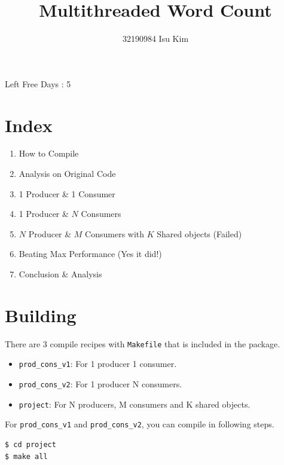 \documentclass{homework}
\begin{document}
\title{Multithreaded Word Count}
\author{32190984 Isu Kim}
\maketitle

\newenvironment{code}{\captionsetup{type=listing}}{}

\maketitle
\begin{center}
Left Free Days : 5
\end{center}
\pagebreak

\section{Index}
\begin{enumerate}
   \item How to Compile
   \item Analysis on Original Code
   \item 1 Producer \& 1 Consumer
   \item 1 Producer \& $N$ Consumers
   \item $N$ Producer \& $M$ Consumers with $K$ Shared objects (Failed)
   \item Beating Max Performance (Yes it did!)
   \item Conclusion \& Analysis
\end{enumerate}
\pagebreak

\setcounter{section}{0}
\section{Building} 
There are 3 compile recipes with \texttt{Makefile} that is included in the package.
\begin{itemize}
   \item \texttt{prod_cons_v1}: For 1 producer 1 consumer.
   \item \texttt{prod_cons_v2}: For 1 producer N consumers.
   \item \texttt{project}: For N producers, M consumers and K shared objects.
\end{itemize}

For \texttt{prod_cons_v1} and \texttt{prod_cons_v2}, you can compile in following steps.
\\
\begin{center}
\begin{code}
\begin{verbatim}
$ cd project
$ make all
\end{verbatim}
\end{code}
\end{center}
\end{document}
